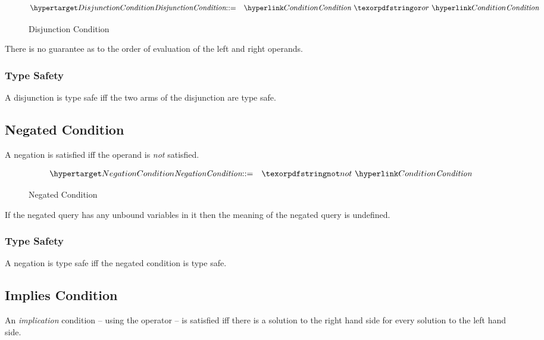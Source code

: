 \begin{figure}[htbp]
\begin{eqnarray*}
\ntDef{DisjunctionCondition}&\arrow&\ntRef{Condition}\ \q{or}\ \ntRef{Condition}
\end{eqnarray*}
\caption{Disjunction Condition}
\label{disjunctionConditionFormFig}
\end{figure}

\begin{aside}
There is no guarantee as to the order of evaluation of the left and right operands.
\end{aside}

\subsubsection{Type Safety}
A disjunction is type safe iff the two arms of the disjunction are type safe.
\begin{prooftree}
\end{prooftree}

\subsection{Negated Condition}
A negation is satisfied iff the operand is \emph{not} satisfied.


\begin{figure}[htbp]
\begin{eqnarray*}
\ntDef{NegationCondition}&\arrow&\q{not}\ \ntRef{Condition}
\end{eqnarray*}
\caption{Negated Condition}
\label{negationConditionFormFig}
\end{figure}

\begin{aside}
If the negated query has any unbound variables in it then the meaning of the negated query is undefined.
\end{aside}

\subsubsection{Type Safety}
A negation is type safe iff the negated condition is type safe.
\begin{prooftree}
\end{prooftree}

\subsection{Implies Condition}
An \emph{implication} condition -- using the  operator -- is satisfied iff there is a solution to the right hand side for every solution to the left hand side.



